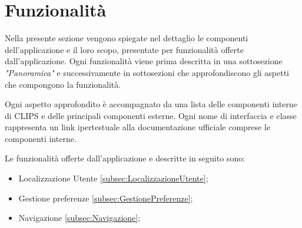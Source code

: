 \documentclass[../ManualeSviluppatore.tex]{subfiles}
\begin{document}
\section{Funzionalità}
	Nella presente sezione vengono spiegate nel dettaglio le componenti dell'applicazione e il loro scopo, presentate per funzionalità offerte dall'applicazione.
	Ogni funzionalità viene prima descritta in una sottosezione \textit{"Panoramica"} e successivamente in sottosezioni che approfondiscono gli aspetti che compongono la funzionalità. 
	
	Ogni aspetto approfondito è accompagnato da una lista delle componenti interne di CLIPS e delle principali componenti esterne. Ogni nome di interfaccia e classe rappresenta un link ipertestuale alla documentazione ufficiale comprese le componenti interne. 
	
	Le funzionalità offerte dall'applicazione e descritte in seguito sono:
	\begin{itemize}
		\item Localizzazione Utente \ref{subsec:LocalizzazioneUtente};
		\item Gestione preferenze \ref{subsec:GestionePreferenze};
		\item Navigazione \ref{subsec:Navigazione};
	\end{itemize}
	
	\newpage
		
	
	\newpage
		
	
	
	\newpage
		
	
\end{document}
